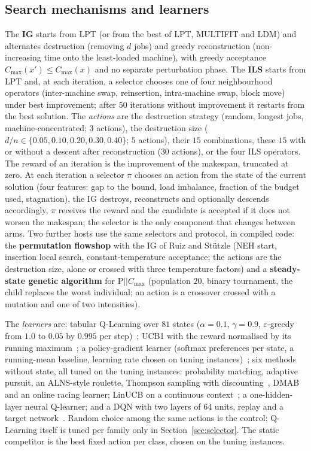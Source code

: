 \documentclass[conference,a4paper]{IEEEtran}
\newcommand{\Cmax}{C_{\max}}
\begin{document}
\subsection{Search mechanisms and learners}
\label{sec:learners}
The \textbf{IG} starts from LPT (or from the best of LPT, MULTIFIT and LDM) and alternates destruction (removing $d$ jobs) and greedy reconstruction (non-increasing time onto the least-loaded machine), with greedy
acceptance $\Cmax(x')\leq\Cmax(x)$ and no separate perturbation phase. The \textbf{ILS} starts from LPT and, at each iteration, a selector chooses one of four neighbourhood operators (inter-machine swap,
reinsertion, intra-machine swap, block move) under best improvement; after $50$ iterations without improvement it restarts from the best solution. The \emph{actions} are the destruction strategy (random, longest jobs, machine-concentrated; $3$ actions), the destruction size
($d/n\in\{0.05,0.10,0.20,0.30,0.40\}$; $5$ actions), their $15$ combinations, these $15$ with or without a descent after reconstruction ($30$ actions), or the four ILS operators.
The reward of an iteration is the improvement of the makespan, truncated at zero. At each iteration a selector $\pi$ chooses an action from the state of the current solution (four features: gap to the bound, load imbalance, fraction of the budget used, stagnation), the IG destroys, reconstructs and optionally descends accordingly, $\pi$ receives the reward and the candidate is accepted if it does not worsen the makespan; the selector is the only component that changes between arms.
Two further hosts use the same selectors and protocol, in compiled code: the \textbf{permutation flowshop} with the IG of Ruiz and St\"utzle (NEH start, insertion local search, constant-temperature acceptance; the actions are the destruction size, alone or crossed with three temperature factors) and a \textbf{steady-state genetic algorithm} for P$||\Cmax$ (population $20$, binary tournament, the child replaces the worst individual; an action is a crossover crossed with a mutation and one of two intensities).

The \emph{learners} are: tabular Q-Learning over $81$ states ($\alpha=0.1$, $\gamma=0.9$,
$\varepsilon$-greedy from $1.0$ to $0.05$ by $0.995$ per step)~\cite{WatkinsDayan1992}; UCB1 with the reward normalised by its running maximum~\cite{AuerEtal2002}; a policy-gradient learner (softmax preferences per state,
a running-mean baseline, learning rate chosen on tuning instances)~\cite{Williams1992,SuttonBarto2018}; six methods without state, all tuned on the tuning instances: probability matching, adaptive pursuit, an ALNS-style roulette, Thompson sampling with discounting~\cite{Russo2018}, DMAB~\cite{DaCostaEtal2008} and an online racing learner; LinUCB on a continuous context~\cite{LiEtAl2010}; a one-hidden-layer neural Q-learner;
and a DQN with two layers of $64$ units, replay and a target network~\cite{MnihEtAl2015}. Random choice among the same actions is the control; Q-Learning itself is tuned per family only in Section~\ref{sec:selector}. The static competitor is the best fixed action per class,
chosen on the tuning instances.
\end{document}
